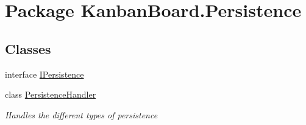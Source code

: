 \hypertarget{namespace_kanban_board_1_1_persistence}{}\section{Package Kanban\+Board.\+Persistence}
\label{namespace_kanban_board_1_1_persistence}
\subsection*{Classes}
\begin{DoxyCompactItemize}
\item 
interface \hyperlink{interface_kanban_board_1_1_persistence_1_1_i_persistence}{I\+Persistence}
\item 
class \hyperlink{class_kanban_board_1_1_persistence_1_1_persistence_handler}{Persistence\+Handler}
\begin{DoxyCompactList}\small\item\em Handles the different types of persistence \end{DoxyCompactList}\end{DoxyCompactItemize}
